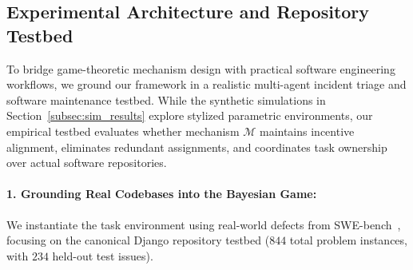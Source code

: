 \documentclass{article}
\theoremstyle{definition}
\begin{document}
\subsection{Experimental Architecture and Repository Testbed}
\label{sec:experimentation}

To bridge game-theoretic mechanism design with practical software engineering workflows, we ground our framework in a realistic multi-agent incident triage and software maintenance testbed. While the synthetic simulations in Section~\ref{subsec:sim_results} explore stylized parametric environments, our empirical testbed evaluates whether mechanism $\mathcal{M}$ maintains incentive alignment, eliminates redundant assignments, and coordinates task ownership over actual software repositories.

\paragraph{1. Grounding Real Codebases into the Bayesian Game:}
We instantiate the task environment using real-world defects from SWE-bench~\cite{jimenez2024swebench}, focusing on the canonical Django repository testbed ($844$ total problem instances, with $234$ held-out test issues). 
\end{document}

